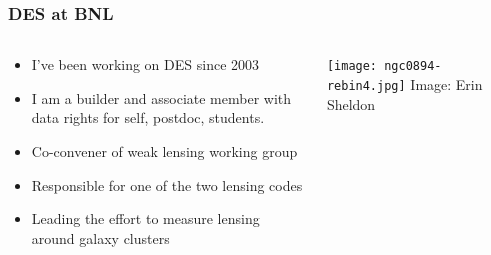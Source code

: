 \documentclass{beamer}
\begin{document}
\frame
{

    \frametitle{DES at BNL}

 
    \begin{columns}
        \begin{column}{0.5\textwidth}    
            \begin{itemize}

                \item I've been working on DES since 2003

                \item I am a {\color{gold} builder} and {\color{gold} associate
                    member} with data rights for self, postdoc, students.

                \item Co-convener of weak lensing working group

                \item Responsible for one of the two lensing codes

                \item Leading the effort to measure lensing around galaxy clusters

            \end{itemize}
        \end{column}
        \begin{column}{0.5\textwidth}
                \centering
                \texttt{[image: ngc0894-rebin4.jpg]}
                \newline
                {\tiny Image: Erin Sheldon}
        \end{column}
    \end{columns}

}
\end{document}
